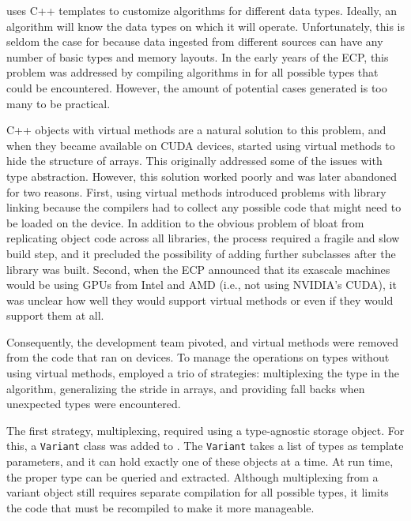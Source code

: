 \vtkm uses C++ templates to customize algorithms for different data types.
Ideally, an algorithm
will know the data types on which it will operate.
Unfortunately, this is seldom the case for \vtkm because data ingested from different sources can have any number of basic types
and memory layouts.
In the early years of the ECP, this problem was addressed by compiling algorithms in \vtkm for all possible types that could be encountered.
However, the amount of potential cases generated is too many to be practical.

C++ objects with virtual methods are a natural solution to this problem, and when they became available on CUDA devices, \vtkm started using virtual methods to hide the structure of arrays.
This originally addressed some of the issues with type abstraction.
However, this solution worked poorly and was later abandoned for two reasons.
First, using virtual methods introduced problems with library linking because the compilers had to collect any possible code that might need to be loaded on the device.
In addition to the obvious problem of bloat from replicating object code across all libraries, the process required a fragile and slow build step, and it precluded the possibility of adding further subclasses after the library was built.
Second, when the ECP announced that its exascale machines would be using GPUs from Intel and AMD (i.e., not using NVIDIA's CUDA), it was unclear how well they would support virtual methods or even if they would support them at all.

Consequently, the \vtkm development team pivoted, and
virtual methods were removed from the \vtkm code that ran on devices.
To manage the operations on types without using virtual methods, \vtkm employed a trio of strategies: multiplexing the type in the algorithm, generalizing the stride in arrays, and providing fall backs when unexpected types were encountered.

The first strategy, multiplexing, required using a type-agnostic storage object.
For this, a \texttt{Variant} class was added to \vtkm.
The \texttt{Variant} takes a list of types as template parameters, and it can hold exactly one of these objects at a time.
At run time, the proper type can be queried and extracted.
Although multiplexing from a variant object still requires separate compilation for all possible types, it limits the code that must be recompiled to make it more manageable.

